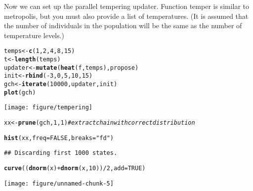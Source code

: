 \documentclass{article}\usepackage[]{graphicx}\usepackage[]{color}
\makeatletter
\def\maxwidth{ %
  \ifdim\Gin@nat@width>\linewidth
    \linewidth
  \else
    \Gin@nat@width
  \fi
}
\newcommand{\hlnum}[1]{\textcolor[rgb]{0.686,0.059,0.569}{#1}}%
\newcommand{\hlstr}[1]{\textcolor[rgb]{0.192,0.494,0.8}{#1}}%
\newcommand{\hlcom}[1]{\textcolor[rgb]{0.678,0.584,0.686}{\textit{#1}}}%
\newcommand{\hlopt}[1]{\textcolor[rgb]{0,0,0}{#1}}%
\newcommand{\hlstd}[1]{\textcolor[rgb]{0.345,0.345,0.345}{#1}}%
\newcommand{\hlkwb}[1]{\textcolor[rgb]{0.69,0.353,0.396}{#1}}%
\newcommand{\hlkwc}[1]{\textcolor[rgb]{0.333,0.667,0.333}{#1}}%
\newcommand{\hlkwd}[1]{\textcolor[rgb]{0.737,0.353,0.396}{\textbf{#1}}}%
\newenvironment{kframe}{%
 \def\at@end@of@kframe{}%
 \ifinner\ifhmode%
  \def\at@end@of@kframe{\end{minipage}}%
  \begin{minipage}{\columnwidth}%
 \fi\fi%
 \def\FrameCommand##1{\hskip\@totalleftmargin \hskip-\fboxsep
 \colorbox{shadecolor}{##1}\hskip-\fboxsep
     \hskip-\linewidth \hskip-\@totalleftmargin \hskip\columnwidth}%
 \MakeFramed {\advance\hsize-\width
   \@totalleftmargin\z@ \linewidth\hsize
   \@setminipage}}%
 {\par\unskip\endMakeFramed%
 \at@end@of@kframe}
\newenvironment{knitrout}{}{} %
\makeatother
\begin{document}
Now we can set up the parallel tempering updater. Function temper is similar to
metropolis, but you must also provide a list of temperatures. (It is
assumed that the number of individuals in the population will be the
same as the number of temperature levels.)
\begin{knitrout}
\color{fgcolor}\begin{kframe}
\begin{alltt}
\hlstd{temps} \hlkwb{<-} \hlkwd{c}\hlstd{(}\hlnum{1}\hlstd{,} \hlnum{2}\hlstd{,} \hlnum{4}\hlstd{,} \hlnum{8}\hlstd{,} \hlnum{15}\hlstd{)}
\hlstd{t} \hlkwb{<-} \hlkwd{length}\hlstd{(temps)}
\hlstd{updater} \hlkwb{<-} \hlkwd{mutate}\hlstd{(}\hlkwd{heat}\hlstd{(f, temps), propose)}
\hlstd{init} \hlkwb{<-} \hlkwd{rbind}\hlstd{(}\hlopt{-}\hlnum{3}\hlstd{,} \hlnum{0}\hlstd{,} \hlnum{5}\hlstd{,} \hlnum{10}\hlstd{,} \hlnum{15}\hlstd{)}
\hlstd{gch} \hlkwb{<-} \hlkwd{iterate}\hlstd{(}\hlnum{10000}\hlstd{, updater, init)}
\hlkwd{plot}\hlstd{(gch)}
\end{alltt}
\end{kframe}
\texttt{[image: figure/tempering]} 
\begin{kframe}\begin{alltt}
\hlstd{xx} \hlkwb{<-} \hlkwd{prune}\hlstd{(gch,} \hlnum{1}\hlstd{,} \hlnum{1}\hlstd{)}  \hlcom{#extract chain with correct distribution}
\end{alltt}
\end{kframe}
\end{knitrout}

\begin{knitrout}
\color{fgcolor}\begin{kframe}
\begin{alltt}
\hlkwd{hist}\hlstd{(xx,} \hlkwc{freq} \hlstd{=} \hlnum{FALSE}\hlstd{,} \hlkwc{breaks} \hlstd{=} \hlstr{"fd"}\hlstd{)}
\end{alltt}
\begin{verbatim}
## Discarding first 1000 states.
\end{verbatim}
\begin{alltt}
\hlkwd{curve}\hlstd{((}\hlkwd{dnorm}\hlstd{(x)} \hlopt{+} \hlkwd{dnorm}\hlstd{(x,} \hlnum{10}\hlstd{))}\hlopt{/}\hlnum{2}\hlstd{,} \hlkwc{add} \hlstd{=} \hlnum{TRUE}\hlstd{)}
\end{alltt}
\end{kframe}
\texttt{[image: figure/unnamed-chunk-5]} 

\end{knitrout}
\end{document}
